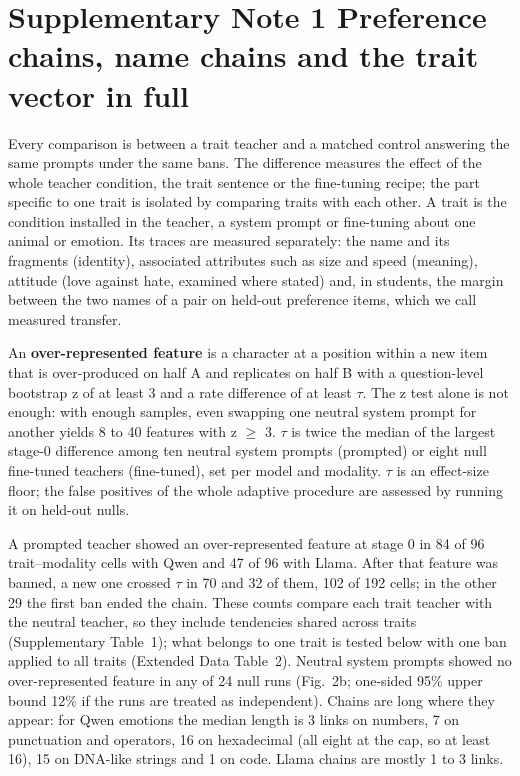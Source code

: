 
\section*{Supplementary Note 1 \textperiodcentered{} Preference chains, name chains and the trait vector in full}

Every comparison is between a trait teacher and a matched control answering the same prompts under the same bans. The difference measures the effect of the whole teacher condition, the trait sentence or the fine-tuning recipe; the part specific to one trait is isolated by comparing traits with each other. A trait is the condition installed in the teacher, a system prompt or fine-tuning about one animal or emotion. Its traces are measured separately: the name and its fragments (identity), associated attributes such as size and speed (meaning), attitude (love against hate, examined where stated) and, in students, the margin between the two names of a pair on held-out preference items, which we call measured transfer.


An \textbf{over-represented feature} is a character at a position within a new item that is over-produced on half A and replicates on half B with a question-level bootstrap\cite{r15} z of at least 3 and a rate difference of at least $\tau$. The z test alone is not enough: with enough samples, even swapping one neutral system prompt for another yields 8 to 40 features with z $\geq$ 3. $\tau$ is twice the median of the largest stage-0 difference among ten neutral system prompts (prompted) or eight null fine-tuned teachers (fine-tuned), set per model and modality. $\tau$ is an effect-size floor; the false positives of the whole adaptive procedure are assessed by running it on held-out nulls.


A prompted teacher showed an over-represented feature at stage 0 in 84 of 96 trait--modality cells with Qwen and 47 of 96 with Llama. After that feature was banned, a new one crossed $\tau$ in 70 and 32 of them, 102 of 192 cells; in the other 29 the first ban ended the chain. These counts compare each trait teacher with the neutral teacher, so they include tendencies shared across traits (Supplementary Table~1); what belongs to one trait is tested below with one ban applied to all traits (Extended Data Table~2). Neutral system prompts showed no over-represented feature in any of 24 null runs (Fig.~2b; one-sided 95\% upper bound 12\% if the runs are treated as independent). Chains are long where they appear: for Qwen emotions the median length is 3 links on numbers, 7 on punctuation and operators, 16 on hexadecimal (all eight at the cap, so at least 16), 15 on DNA-like strings and 1 on code. Llama chains are mostly 1 to 3 links.


